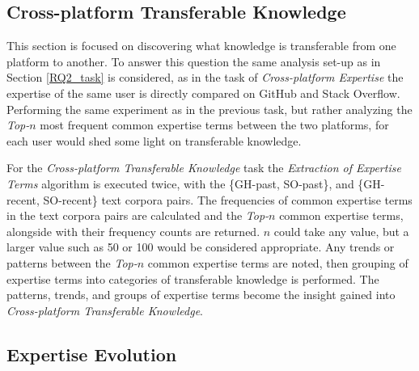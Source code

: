     \subsection{Cross-platform Transferable Knowledge\label{RQ3_task}}
        
        This section is focused on discovering what knowledge is transferable from one platform to another. To answer this question the same analysis set-up as in Section \ref{RQ2_task} is considered, as in the task of \emph{Cross-platform Expertise} the expertise of the same user is directly compared on GitHub and Stack Overflow. Performing the same experiment as in the previous task, but rather analyzing the \emph{Top-$n$} most frequent common expertise terms between the two platforms, for each user would shed some light on transferable knowledge.
        
        For the \emph{Cross-platform Transferable Knowledge} task the \emph{Extraction of Expertise Terms} algorithm is executed twice, with the \{GH-past, SO-past\}, and \{GH-recent, SO-recent\} text corpora pairs. The frequencies of common expertise terms in the text corpora pairs are calculated and the \emph{Top-$n$} common expertise terms, alongside with their frequency counts are returned. $n$ could take any value, but a larger value such as 50 or 100 would be considered appropriate. Any trends or patterns between the \emph{Top-$n$} common expertise terms are noted, then grouping of expertise terms into categories of transferable knowledge is performed. The patterns, trends, and groups of expertise terms become the insight gained into \emph{Cross-platform Transferable Knowledge}.
        
    \subsection{Expertise Evolution\label{RQ4_task}}
        

